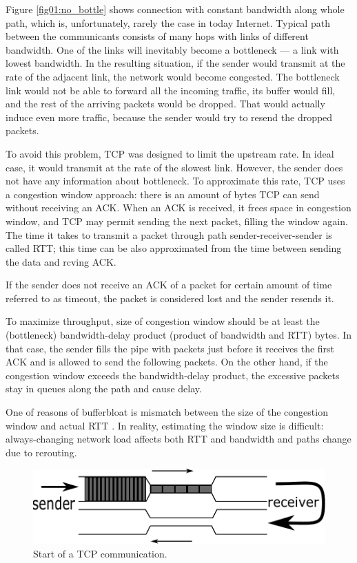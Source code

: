 Figure \ref{fig01:no_bottle} shows connection with constant bandwidth along whole path, which is, unfortunately, rarely the case in today Internet. Typical path between the communicants consists of many hops with links of different bandwidth. One of the links will inevitably become a bottleneck --- a link with lowest bandwidth. In the resulting situation, if the sender would transmit at the rate of the adjacent link, the network would become congested. The bottleneck link would not be able to forward all the incoming traffic, its buffer would fill, and the rest of the arriving packets would be dropped. That would actually induce even more traffic, because the sender would try to resend the dropped packets.

To avoid this problem, TCP was designed to limit the upstream rate. In ideal case, it would transmit at the rate of the slowest link. However, the sender does not have any information about bottleneck. To approximate this rate, TCP uses a congestion window approach: there is an amount of bytes TCP can send without receiving an ACK. When an ACK is received, it frees space in congestion window, and TCP may permit sending the next packet, filling the window again. The time it takes to transmit a packet through path sender-receiver-sender is called RTT; this time can be also approximated from the time between sending the data and rcving ACK.

If the sender does not receive an ACK of a packet for certain amount of time referred to as timeout, the packet is considered lost and the sender resends it.

To maximize throughput, size of congestion window should be at least the (bottleneck) bandwidth-delay product (product of bandwidth and RTT) bytes. In that case, the sender fills the pipe with packets just before it receives the first ACK and is allowed to send the following packets. On the other hand, if the congestion window exceeds the bandwidth-delay product, the excessive packets stay in queues along the path and cause delay. 

One of reasons of bufferbloat is mismatch between the size of the congestion window and actual RTT \cite{CoDel}. In reality, estimating the window size is difficult: always-changing network load affects both RTT and bandwidth and paths change due to rerouting.

\begin{figure}
	\centering
	\includegraphics[width=137mm]{drawings/tcp_bottleneck_1}
	\caption{Start of a TCP communication.}
	
	\label{fig02:bottle_1}
\end{figure}


